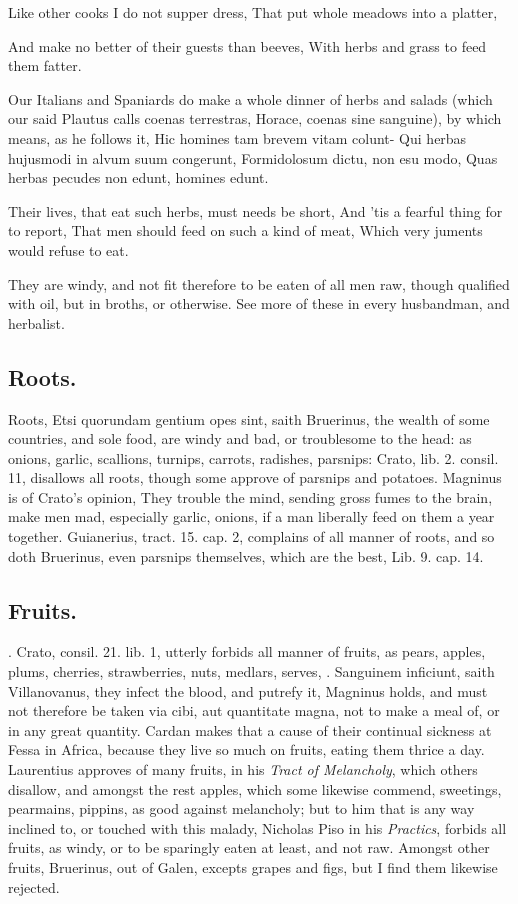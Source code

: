 {{Like other cooks I do not supper dress,
That put whole meadows into a platter,

And make no better of their guests than beeves,
With herbs and grass to feed them fatter.

Our Italians and Spaniards do make a whole dinner of herbs and salads
(which our said Plautus calls coenas terrestras, Horace, coenas sine
sanguine), by which means, as he follows it,
Hic homines tam brevem vitam colunt-
Qui herbas hujusmodi in alvum suum congerunt,
Formidolosum dictu, non esu modo,
Quas herbas pecudes non edunt, homines edunt.

Their lives, that eat such herbs, must needs be short,
And 'tis a fearful thing for to report,
That men should feed on such a kind of meat,
Which very juments would refuse to eat.

They are windy, and not fit therefore to be eaten of all men raw,
though qualified with oil, but in broths, or otherwise. See more of
these in every husbandman, and herbalist.
\subsection{Roots.}
Roots, Etsi quorundam gentium opes sint, saith Bruerinus, the
wealth of some countries, and sole food, are windy and bad, or
troublesome to the head: as onions, garlic, scallions, turnips,
carrots, radishes, parsnips: Crato, lib. 2. consil. 11, disallows all
roots, though  some approve of parsnips and potatoes.
Magninus is of Crato's opinion, They trouble the mind,
sending gross fumes to the brain, make men mad, especially garlic,
onions, if a man liberally feed on them a year together. Guianerius,
tract. 15. cap. 2, complains of all manner of roots, and so doth
Bruerinus, even parsnips themselves, which are the best, Lib. 9. cap.
14.
\subsection{Fruits.}
. Crato, consil. 21.
lib. 1, utterly forbids all manner of fruits, as pears, apples, plums,
cherries, strawberries, nuts, medlars, serves, \etc{}. Sanguinem inficiunt,
saith Villanovanus, they infect the blood, and putrefy it, Magninus
holds, and must not therefore be taken via cibi, aut quantitate magna,
not to make a meal of, or in any great quantity. Cardan makes
that a cause of their continual sickness at Fessa in Africa, because
they live so much on fruits, eating them thrice a day. Laurentius
approves of many fruits, in his \emph{Tract of Melancholy}, which others
disallow, and amongst the rest apples, which some likewise commend,
sweetings, pearmains, pippins, as good against melancholy; but to him
that is any way inclined to, or touched with this malady,
Nicholas Piso in his \emph{Practics}, forbids all fruits, as windy, or
to be sparingly eaten at least, and not raw. Amongst other fruits,
Bruerinus, out of Galen, excepts grapes and figs, but I find them
likewise rejected.
}}
